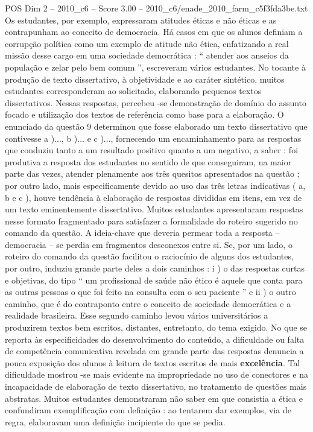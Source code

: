 \begin{textsample}{POS Dim 2 – 2010\_c6 – Score 3.00 – 2010\_c6/enade\_2010\_farm\_c5f3fda3be.txt}
Os estudantes, por exemplo, expressaram atitudes éticas e não éticas e as contrapunham ao conceito de democracia.
Há casos em que os alunos definiam a corrupção política como um exemplo de atitude não ética, enfatizando a real missão desse cargo em uma sociedade democrática : “ atender aos anseios da população e zelar pelo bem comum ”, escreveram vários estudantes.
No tocante à produção de texto dissertativo, à objetividade e ao caráter sintético, muitos estudantes corresponderam ao solicitado, elaborando pequenos textos dissertativos.
Nessas respostas, percebeu -se demonstração de domínio do assunto focado e utilização dos textos de referência como base para a elaboração.
O enunciado da questão 9 determinou que fosse elaborado um texto dissertativo que contivesse a )..., b )... e c )..., fornecendo um encaminhamento para as respostas que conduziu tanto a um resultado positivo quanto a um negativo, a saber : foi produtiva a resposta dos estudantes no sentido de que conseguiram, na maior parte das vezes, atender plenamente aos três quesitos apresentados na questão ; por outro lado, mais especificamente devido ao uso das três letras indicativas ( a, b e c ), houve tendência à elaboração de respostas divididas em itens, em vez de um texto eminentemente dissertativo.
Muitos estudantes apresentaram respostas nesse formato fragmentado para satisfazer a formalidade do roteiro sugerido no comando da questão.
A ideia-chave que deveria permear toda a resposta – democracia – se perdia em fragmentos desconexos entre si.
Se, por um lado, o roteiro do comando da questão facilitou o raciocínio de alguns dos estudantes, por outro, induziu grande parte deles a dois caminhos : i ) o das respostas curtas e objetivas, do tipo “ um profissional de saúde não ético é aquele que conta para as outras pessoas o que foi feito na consulta com o seu paciente ” e ii ) o outro caminho, que é do contraponto entre o conceito de sociedade democrática e a realidade brasileira.
Esse segundo caminho levou vários universitários a produzirem textos bem escritos, distantes, entretanto, do tema exigido.
No que se reporta às especificidades do desenvolvimento do conteúdo, a dificuldade ou falta de competência comunicativa revelada em grande parte das respostas denuncia a pouca exposição dos alunos à leitura de textos escritos de mais \textbf{excelência}.
Tal dificuldade mostrou -se mais evidente na impropriedade no uso de conectores e na incapacidade de elaboração de texto dissertativo, no tratamento de questões mais abstratas.
Muitos estudantes demonstraram não saber em que consistia a ética e confundiram exemplificação com definição : ao tentarem dar exemplos, via de regra, elaboravam uma definição incipiente do que se pedia.

\end{textsample}
